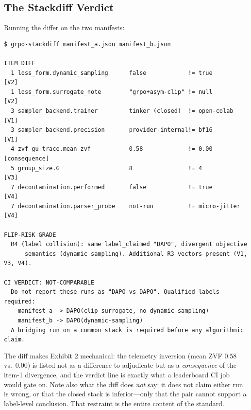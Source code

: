 \documentclass{article}  \usepackage[preprint,nonatbib]{neurips_2026} \usepackage[numbers]{natbib}
\begin{document}
\subsection{The Stackdiff Verdict}
\label{app:p5-verdict}
Running the differ on the two manifests:
\begin{lstlisting}[basicstyle=\ttfamily\footnotesize, frame=single,
                   breaklines=true, columns=fullflexible]
$ grpo-stackdiff manifest_a.json manifest_b.json

ITEM DIFF
  1 loss_form.dynamic_sampling      false            != true          [V2]
  1 loss_form.surrogate_note        "grpo+asym-clip" != null          [V2]
  3 sampler_backend.trainer         tinker (closed)  != open-colab    [V1]
  3 sampler_backend.precision       provider-internal!= bf16          [V1]
  4 zvf_gu_trace.mean_zvf           0.58             != 0.00          [consequence]
  5 group_size.G                    8                != 4             [V3]
  7 decontamination.performed       false            != true          [V4]
  7 decontamination.parser_probe    not-run          != micro-jitter  [V4]

FLIP-RISK GRADE
  R4 (label collision): same label_claimed "DAPO", divergent objective
      semantics (dynamic_sampling). Additional R3 vectors present (V1, V3, V4).

CI VERDICT: NOT-COMPARABLE
  Do not report these runs as "DAPO vs DAPO". Qualified labels required:
    manifest_a -> DAPO(clip-surrogate, no-dynamic-sampling)
    manifest_b -> DAPO(dynamic-sampling)
  A bridging run on a common stack is required before any algorithmic claim.
\end{lstlisting}
The diff makes Exhibit 2 mechanical: the telemetry inversion (mean ZVF $0.58$
vs.\ $0.00$) is listed not as a difference to adjudicate but as a
\emph{consequence} of the item-1 divergence, and the verdict line is exactly
what a leaderboard CI job would gate on. Note also what the diff does
\emph{not} say: it does not claim either run is wrong, or that the closed
stack is inferior---only that the pair cannot support a label-level
conclusion. That restraint is the entire content of the standard.
 

\end{document}
